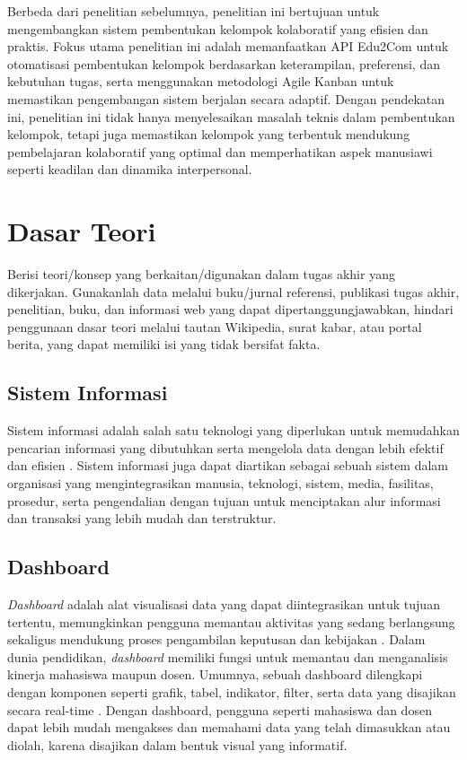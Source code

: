 Berbeda dari penelitian sebelumnya, penelitian ini bertujuan untuk mengembangkan sistem pembentukan kelompok kolaboratif yang efisien dan praktis. Fokus utama penelitian ini adalah memanfaatkan API Edu2Com untuk otomatisasi pembentukan kelompok berdasarkan keterampilan, preferensi, dan kebutuhan tugas, serta menggunakan metodologi Agile Kanban untuk memastikan pengembangan sistem berjalan secara adaptif. Dengan pendekatan ini, penelitian ini tidak hanya menyelesaikan masalah teknis dalam pembentukan kelompok, tetapi juga memastikan kelompok yang terbentuk mendukung pembelajaran kolaboratif yang optimal dan memperhatikan aspek manusiawi seperti keadilan dan dinamika interpersonal.

\section{Dasar Teori} \label{II.Teori}
Berisi teori/konsep yang berkaitan/digunakan dalam tugas akhir yang dikerjakan. Gunakanlah data melalui buku/jurnal referensi, publikasi tugas akhir, penelitian, buku, dan informasi web yang dapat dipertanggungjawabkan, hindari penggunaan dasar teori melalui tautan Wikipedia, surat kabar, atau portal berita, yang dapat memiliki isi yang tidak bersifat fakta. \par

\subsection{Sistem Informasi} \label{II.Teori1}
Sistem informasi adalah salah satu teknologi yang diperlukan untuk memudahkan pencarian informasi yang dibutuhkan serta mengelola data dengan lebih efektif dan efisien \cite{Arief2022}. Sistem informasi juga dapat diartikan sebagai sebuah sistem dalam organisasi yang mengintegrasikan manusia, teknologi, sistem, media, fasilitas, prosedur, serta pengendalian dengan tujuan untuk menciptakan alur informasi dan transaksi yang lebih mudah dan terstruktur.

\subsection{Dashboard} \label{II.Teori2}
\textit{Dashboard} adalah alat visualisasi data yang dapat diintegrasikan untuk tujuan tertentu, memungkinkan pengguna memantau aktivitas yang sedang berlangsung sekaligus mendukung proses pengambilan keputusan dan kebijakan \cite{Sarikaya2019}. Dalam dunia pendidikan, \textit{dashboard} memiliki fungsi untuk memantau dan menganalisis kinerja mahasiswa maupun dosen. Umumnya, sebuah dashboard dilengkapi dengan komponen seperti grafik, tabel, indikator, filter, serta data yang disajikan secara real-time \cite{Maulani2020}. Dengan dashboard, pengguna seperti mahasiswa dan dosen dapat lebih mudah mengakses dan memahami data yang telah dimasukkan atau diolah, karena disajikan dalam bentuk visual yang informatif.

